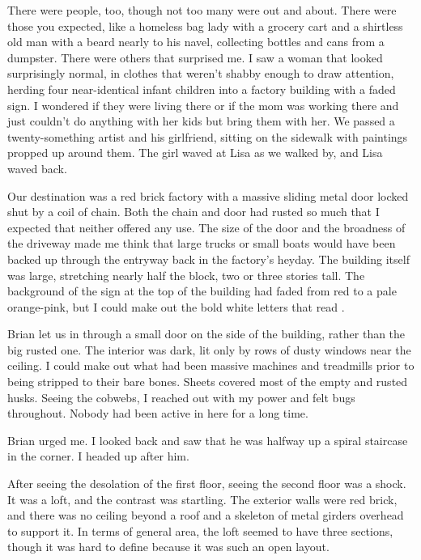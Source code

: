 There were people, too, though not too many were out and about. There were those you expected, like a homeless bag lady with a grocery cart and a shirtless old man with a beard nearly to his navel, collecting bottles and cans from a dumpster. There were others that surprised me. I saw a woman that looked surprisingly normal, in clothes that weren't shabby enough to draw attention, herding four near-identical infant children into a factory building with a faded sign. I wondered if they were living there or if the mom was working there and just couldn't do anything with her kids but bring them with her. We passed a twenty-something artist and his girlfriend, sitting on the sidewalk with paintings propped up around them. The girl waved at Lisa as we walked by, and Lisa waved back.

Our destination was a red brick factory with a massive sliding metal door locked shut by a coil of chain. Both the chain and door had rusted so much that I expected that neither offered any use. The size of the door and the broadness of the driveway made me think that large trucks or small boats would have been backed up through the entryway back in the factory's heyday. The building itself was large, stretching nearly half the block, two or three stories tall. The background of the sign at the top of the building had faded from red to a pale orange-pink, but I could make out the bold white letters that read .

Brian let us in through a small door on the side of the building, rather than the big rusted one. The interior was dark, lit only by rows of dusty windows near the ceiling. I could make out what had been massive machines and treadmills prior to being stripped to their bare bones. Sheets covered most of the empty and rusted husks. Seeing the cobwebs, I reached out with my power and felt bugs throughout. Nobody had been active in here for a long time.

 Brian urged me. I looked back and saw that he was halfway up a spiral staircase in the corner. I headed up after him.

After seeing the desolation of the first floor, seeing the second floor was a shock. It was a loft, and the contrast was startling. The exterior walls were red brick, and there was no ceiling beyond a roof and a skeleton of metal girders overhead to support it. In terms of general area, the loft seemed to have three sections, though it was hard to define because it was such an open layout.

